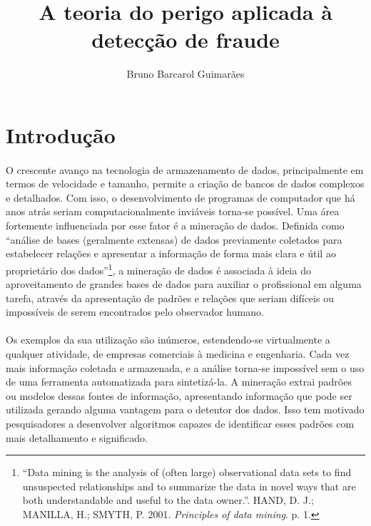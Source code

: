 \documentclass{article}
\title{A teoria do perigo aplicada à detecção de fraude}
\author{Bruno Barcarol Guimarães}
\begin{document}
\maketitle
\newpage

\tableofcontents{}
\newpage

\section{Introdução}

\paragraph{}O crescente avanço na tecnologia de armazenamento de dados, principalmente em termos de velocidade e tamanho, permite a criação de bancos de dados complexos e detalhados. Com isso, o desenvolvimento de programas de computador que há anos atrás seriam computacionalmente inviáveis torna-se possível. Uma área fortemente influenciada por esse fator é a mineração de dados. Definida como ``análise de bases (geralmente extensas) de dados previamente coletados para estabelecer relações e apresentar a informação de forma mais clara e útil ao proprietário dos dados''\footnote{``Data mining is the analysis of (often large) observational data sets to find unsuspected relationships and to summarize the data in novel ways that are both understandable and useful to the data owner.''. HAND, D. J.; MANILLA, H.; SMYTH, P. 2001. \emph{Principles of data mining}. p. 1.}, a mineração de dados é associada à ideia do aproveitamento de grandes bases de dados para auxiliar o profissional em alguma tarefa, através da apresentação de padrões e relações que seriam difíceis ou impossíveis de serem encontrados pelo observador humano.

\paragraph{}Os exemplos da sua utilização são inúmeros, estendendo-se virtualmente a qualquer atividade, de empresas comerciais à medicina e engenharia. Cada vez mais informação coletada e armazenada, e a análise torna-se impossível sem o uso de uma ferramenta automatizada para sintetizá-la. A mineração extrai padrões ou modelos dessas fontes de informação, apresentando informação que pode ser utilizada gerando alguma vantagem para o detentor dos dados. Isso tem motivado pesquisadores a desenvolver algoritmos capazes de identificar esses padrões com mais detalhamento e significado.
\end{document}
